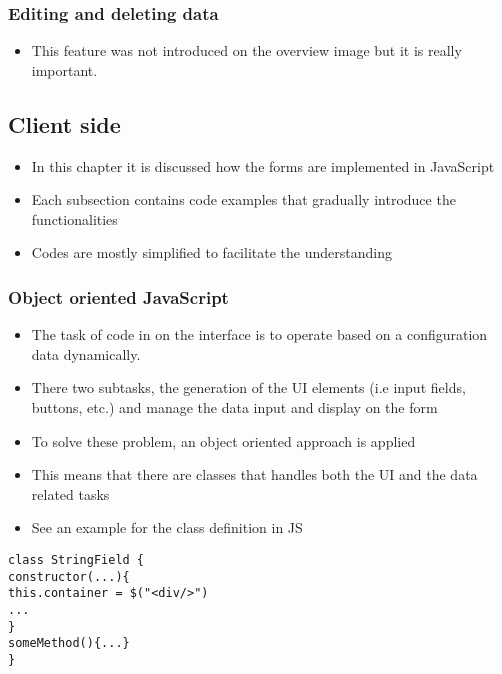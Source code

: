 \subsubsection{Editing and deleting data}

\begin{itemize}
	\item This feature was not introduced on the overview image but it is really important.
\end{itemize}




\subsection{Client side}

\begin{itemize}
	\item In this chapter it is discussed how the forms are implemented in JavaScript
	\item Each subsection contains code examples that gradually introduce the functionalities
	\item Codes are mostly simplified to facilitate the understanding		
\end{itemize}


\subsubsection{Object oriented JavaScript}

\begin{itemize}
	\item The task of code in on the interface is to operate based on a configuration data dynamically.
	\item There two subtasks, the generation of the UI elements (i.e input fields, buttons, etc.) and manage the data input and display on the form
	\item To solve these problem, an object oriented approach is applied
	\item This means that there are classes that handles both the UI and the data related tasks
	\item See an example for the class definition in JS
\end{itemize}


\begin{lstlisting}[basicstyle=\footnotesize, frame=single, caption={JavaScript class}, captionpos=b]
class StringField {
constructor(...){
this.container = $("<div/>")
...
}
someMethod(){...}			
}
\end{lstlisting}

